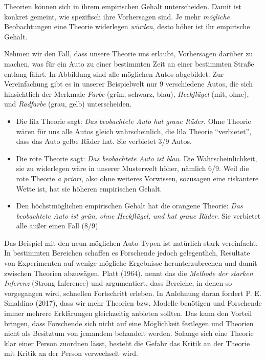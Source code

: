 \documentclass[
  letterpaper,
  DIV=11,
  numbers=noendperiod]{scrreprt}
\begin{document}
\begin{tcolorbox}[enhanced jigsaw, left=2mm, colback=white, colframe=quarto-callout-tip-color-frame, opacitybacktitle=0.6, opacityback=0, title=\textcolor{quarto-callout-tip-color}{\faLightbulb}\hspace{0.5em}{Empirischer Gehalt und Strong Inference}, toptitle=1mm, coltitle=black, colbacktitle=quarto-callout-tip-color!10!white, titlerule=0mm, bottomtitle=1mm, leftrule=.75mm, breakable, rightrule=.15mm, bottomrule=.15mm, toprule=.15mm, arc=.35mm]

Theorien können sich in ihrem empirischen Gehalt unterscheiden. Damit
ist konkret gemeint, wie spezifisch ihre Vorhersagen sind. Je mehr
\emph{mögliche} Beobachtungen eine Theorie widerlegen \emph{würden},
desto höher ist ihr empirische Gehalt.

Nehmen wir den Fall, dass unsere Theorie uns erlaubt, Vorhersagen
darüber zu machen, was für ein Auto zu einer bestimmten Zeit an einer
bestimmten Straße entlang fährt. In Abbildung sind alle möglichen Autos
abgebildet. Zur Vereinfachung gibt es in unserer Beispielwelt nur 9
verschiedene Autos, die sich hinsichtlich der Merkmale \emph{Farbe}
(grün, schwarz, blau), \emph{Heckflügel} (mit, ohne), und
\emph{Radfarbe} (grau, gelb) unterscheiden.

\begin{itemize}
\item
  Die lila Theorie sagt: \emph{Das beobachtete Auto hat graue Räder}.
  Ohne Theorie wären für uns alle Autos gleich wahrscheinlich, die lila
  Theorie ``verbietet'', dass das Auto gelbe Räder hat. Sie verbietet
  3/9 Autos.
\item
  Die rote Theorie sagt: \emph{Das beobachtete Auto ist blau}. Die
  Wahrscheinlichkeit, sie zu widerlegen wäre in unserer Musterwelt
  höher, nämlich 6/9. Weil die rote Theorie \emph{a priori}, also ohne
  weiteres Vorwissen, sozusagen eine riskantere Wette ist, hat sie
  höheren empirischen Gehalt.
\item
  Den höchstmöglichen empirischen Gehalt hat die orangene Theorie:
  \emph{Das beobachtete Auto ist grün, ohne Heckflügel, und hat graue
  Räder}. Sie verbietet alle außer einen Fall (8/9).
\end{itemize}

Das Beispiel mit den neun möglichen Auto-Typen ist natürlich stark
vereinfacht. In bestimmten Bereichen schaffen es Forschende jedoch
gelegentlich, Resultate von Experimenten auf wenige mögliche Ergebnisse
herunterzubrechen und damit zwischen Theorien abzuwägen. Platt (1964).
nennt das die \emph{Methode der starken Inferenz} (Strong Inference) und
argumentiert, dass Bereiche, in denen so vorgegangen wird, schnellen
Fortschritt erleben. In Anlehnung daran fordert P. E. Smaldino (2017),
dass wir mehr Theorien bzw. Modelle benötigen und Forschende immer
mehrere Erklärungen gleichzeitig anbieten sollten. Das kann den Vorteil
bringen, dass Forschende sich nicht auf eine Möglichkeit festlegen und
Theorien nicht als Besitztum von jemandem behandelt werden. Solange sich
eine Theorie klar einer Person zuordnen lässt, besteht die Gefahr das
Kritik an der Theorie mit Kritik an der Person verwechselt wird.


\end{tcolorbox}
\end{document}
